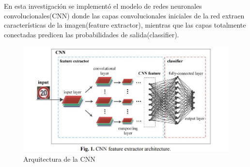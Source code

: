 	En esta investigación se implementó el modelo de redes neuronales convolucionales(CNN) donde las capas convolucionales iniciales de la red extraen características de la imagen(feature extractor), mientras que las capas totalmente conectadas predicen las probabilidades de salida(classifier).

		\begin{figure}[H]
		\includegraphics[width=1\textwidth]{images/desarrollo/networkArquitec/tempGeneralCNNmodel}
		\begin{center}
		\caption{\small{Arquitectura de la CNN}}
		\vspace{-1em}
		{\small{\fontsize{10}{16.8}\selectfont {Extreme Learning Classifier}}}
		\end{center}
		\vspace{-1.5em}
		\end{figure}

